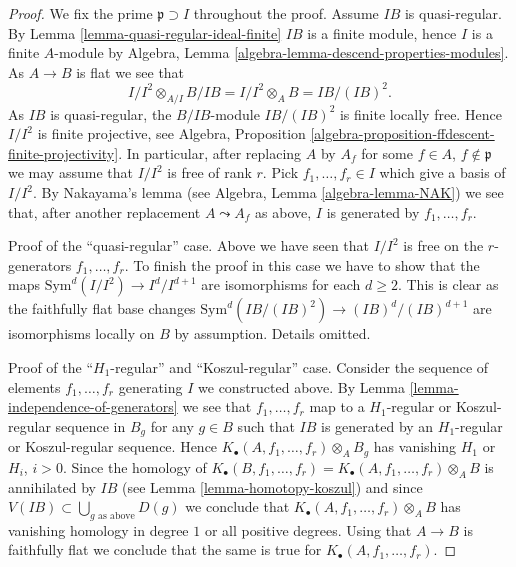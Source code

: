 \documentclass[10pt,a4paper]{amsart}
\theoremstyle{plain}
\theoremstyle{definition}
\theoremstyle{remark}
\numberwithin{equation}{subsection}
\begin{document}
\begin{proof}
We fix the prime $\mathfrak p \supset I$ throughout the proof.
Assume $IB$ is quasi-regular. By
Lemma \ref{lemma-quasi-regular-ideal-finite}
$IB$ is a finite module, hence $I$ is a finite $A$-module by
Algebra, Lemma \ref{algebra-lemma-descend-properties-modules}.
As $A \to B$ is flat we see that
$$
I/I^2 \otimes_{A/I} B/IB = I/I^2 \otimes_A B = IB/(IB)^2.
$$
As $IB$ is quasi-regular, the $B/IB$-module $IB/(IB)^2$ is finite
locally free. Hence $I/I^2$ is finite projective, see
Algebra, Proposition \ref{algebra-proposition-ffdescent-finite-projectivity}.
In particular, after replacing $A$ by $A_f$ for some
$f \in A$, $f \not \in \mathfrak p$ we may assume that $I/I^2$ is free of
rank $r$. Pick $f_1, \ldots, f_r \in I$ which
give a basis of $I/I^2$. By Nakayama's lemma (see
Algebra, Lemma \ref{algebra-lemma-NAK})
we see that, after another replacement $A \leadsto A_f$ as above,
$I$ is generated by $f_1, \ldots, f_r$.

\medskip\noindent
Proof of the ``quasi-regular'' case. Above we have seen that
$I/I^2$ is free on the $r$-generators $f_1, \ldots, f_r$.
To finish the proof in this case we have to show that the maps
$\text{Sym}^d(I/I^2) \to I^d/I^{d + 1}$ are isomorphisms
for each $d \geq 2$. This is clear as the faithfully flat
base changes $\text{Sym}^d(IB/(IB)^2) \to (IB)^d/(IB)^{d + 1}$
are isomorphisms locally on $B$ by assumption.
Details omitted.

\medskip\noindent
Proof of the ``$H_1$-regular'' and ``Koszul-regular'' case.
Consider the sequence of elements $f_1, \ldots, f_r$ generating
$I$ we constructed above. By
Lemma \ref{lemma-independence-of-generators}
we see that $f_1, \ldots, f_r$ map to a $H_1$-regular or Koszul-regular
sequence in $B_g$ for any $g \in B$ such that $IB$ is generated by
an $H_1$-regular or Koszul-regular sequence. Hence
$K_\bullet(A, f_1, \ldots, f_r) \otimes_A B_g$ has vanishing
$H_1$ or $H_i$, $i > 0$. Since the homology of
$K_\bullet(B, f_1, \ldots, f_r) = K_\bullet(A, f_1, \ldots, f_r) \otimes_A B$
is annihilated by $IB$ (see
Lemma \ref{lemma-homotopy-koszul})
and since $V(IB) \subset \bigcup_{g\text{ as above}} D(g)$ we conclude that
$K_\bullet(A, f_1, \ldots, f_r) \otimes_A B$ has vanishing homology in
degree $1$ or all positive degrees. Using that $A \to B$ is faithfully
flat we conclude that the same is true for
$K_\bullet(A, f_1, \ldots, f_r)$.
\end{proof}
\end{document}
